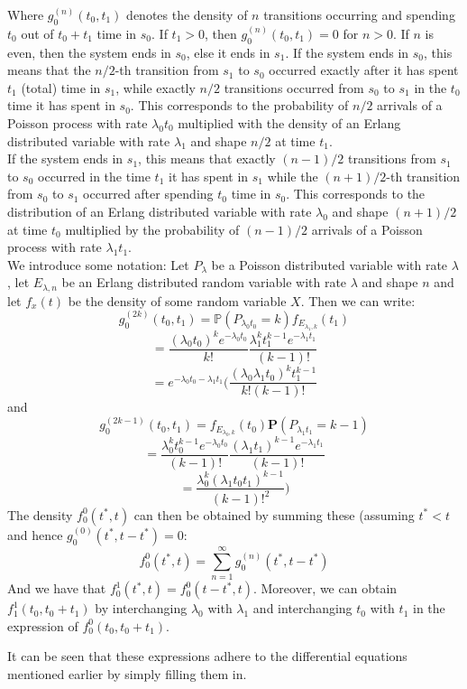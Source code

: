 Where $g_0^{(n)}(t_0,t_1)$ denotes the density of $n$ transitions occurring and spending $t_0$ out of $t_0+t_1$ time in $s_0$. If $t_1>0$, then $g_0^{(n)}(t_0,t_1)=0$ for $n>0$. If $n$ is even, then the system ends in $s_0$, else it ends in $s_1$.
If the system ends in $s_0$, this means that the $n/2$-th transition from $s_1$ to $s_0$ occurred exactly after it has spent $t_1$ (total) time in $s_1$, while exactly $n/2$ transitions occurred from $s_0$ to $s_1$ in the $t_0$ time it has spent in $s_0$. This corresponds to the probability of $n/2$ arrivals of a Poisson process with rate $\lambda_0t_0$ multiplied with the density of an Erlang distributed variable with rate $\lambda_1$ and shape $n/2$ at time $t_1$.\\
If the system ends in $s_1$, this means that exactly $(n-1)/2$ transitions from $s_1$ to $s_0$ occurred in the time $t_1$ it has spent in $s_1$ while the $(n+1)/2$-th transition from $s_0$ to $s_1$ occurred after spending $t_0$ time in $s_0$. This corresponds to the distribution of an Erlang distributed variable with rate $\lambda_0$ and shape $(n+1)/2$ at time $t_0$ multiplied by the probability of $(n-1)/2$ arrivals of a Poisson process with rate $\lambda_1t_1$.\\  We introduce some notation: Let $P_{\lambda}$ be a Poisson distributed variable with rate $\lambda$, let $E_{\lambda,n}$ be an Erlang distributed random variable with rate $\lambda$ and shape $n$ and let $f_x(t)$ be the density of some random variable $X$. Then we can write:
$$
g_0^{(2k)}(t_0,t_1)=\mathbb{P}(P_{\lambda_0t_0}=k)f_{E_{\lambda_1,k}}(t_1)
$$
$$
=\frac{(\lambda_0t_0)^ke^{-\lambda_0t_0}}{k!}\frac{\lambda_1^kt_1^{k-1}e^{-\lambda_1t_1}}{(k-1)!}
$$
$$
=e^{-\lambda_0t_0-\lambda_1t_1}(\frac{(\lambda_0\lambda_1t_0)^kt_1^{k-1}}{k!(k-1)!}
$$
and
$$
g_0^{(2k-1)}(t_0,t_1)=f_{E_{\lambda_0,k}}(t_0)\mathbf{P}(P_{\lambda_1t_1}=k-1)
$$
$$
=\frac{\lambda_0^kt_0^{k-1}e^{-\lambda_0t_0}}{(k-1)!}\frac{(\lambda_1t_1)^{k-1}e^{-\lambda_1t_1}}{(k-1)!}
$$
$$
=\frac{\lambda_0^k(\lambda_1t_0t_1)^{k-1}}{(k-1)!^2})
$$
The density $f_0^0(t^*,t)$ can then be obtained by summing these (assuming $t^*<t$ and hence $g_0^{(0)}(t^*,t-t^*)=0$:
$$
f_0^0(t^*,t)=\sum\limits_{n=1}^\infty g_0^{(n)}(t^*,t-t^*)
$$
And we have that $f_0^1(t^*,t)=f_0^0(t-t^*,t)$. Moreover, we can obtain $f_1^1(t_0,t_0+t_1)$ by interchanging $\lambda_0$ with $\lambda_1$ and interchanging $t_0$ with $t_1$ in the expression of $f_0^0(t_0,t_0+t_1)$.

It can be seen that these expressions adhere to the differential equations mentioned earlier by simply filling them in.
